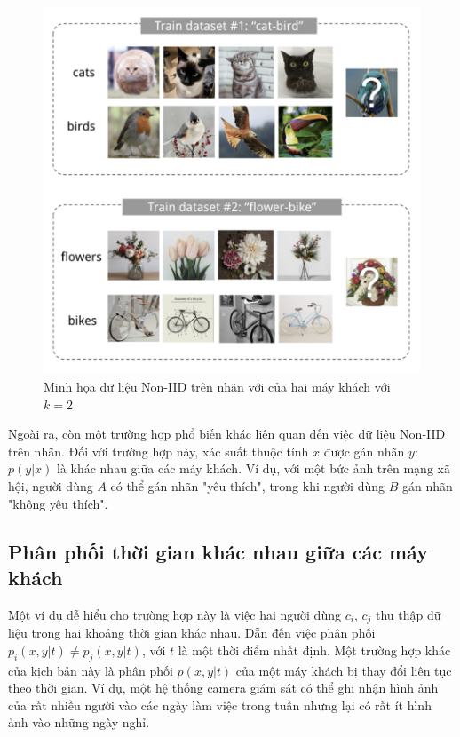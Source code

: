 \begin{figure}[H]
    \centering
    \includegraphics[scale=0.7]{../images/noniid_label.png}
    \caption{Minh họa dữ liệu Non-IID trên nhãn với của hai máy khách với $k=2$}
    \label{fig:my_noniid}
\end{figure}

Ngoài ra, còn một trường hợp phổ biến khác liên quan đến việc dữ liệu Non-IID trên nhãn. Đối với trường hợp này, xác suất thuộc tính $x$ được gán nhãn $y$: $p(y|x)$ là khác nhau giữa các máy khách. Ví dụ, với một bức ảnh trên mạng xã hội, người dùng $A$ có thể gán nhãn "yêu thích", trong khi người dùng $B$ gán nhãn "không yêu thích".

\subsection{Phân phối thời gian khác nhau giữa các máy khách}

Một ví dụ dễ hiểu cho trường hợp này là việc hai người dùng $c_i$, $c_j$ thu thập dữ liệu trong hai khoảng thời gian khác nhau. Dẫn đến việc phân phối $p_i(x, y|t) \ne p_j(x, y|t)$, với $t$ là một thời điểm nhất định. Một trường hợp khác của kịch bản này là phân phối $p(x, y|t)$ của một máy khách bị thay đổi liên tục theo thời gian. Ví dụ, một hệ thống camera giám sát có thể ghi nhận hình ảnh của rất nhiều người vào các ngày làm việc trong tuần nhưng lại có rất ít hình ảnh vào những ngày nghỉ.

